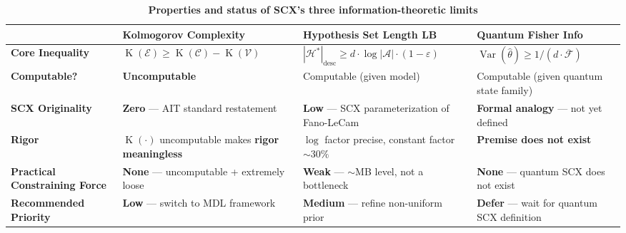 \documentclass[12pt,a4paper]{article}
\theoremstyle{plain}
\theoremstyle{definition}
\DeclareMathOperator{\Kolm}{K}
\DeclareMathOperator{\Var}{Var}
\newcommand{\FisherQuantum}{\mathcal{F}}
\begin{document}
\begin{table}[h!]
\centering
\caption{\textbf{Properties and status of SCX's three information-theoretic limits}}
\label{tab:three_limits}
\renewcommand{\arraystretch}{1.6}
\begin{tabular}{@{}p{2.8cm} p{3.5cm} p{3.5cm} p{3.5cm}@{}}
\toprule
& \textbf{Kolmogorov Complexity} & \textbf{Hypothesis Set Length LB} & \textbf{Quantum Fisher Info} \\
\midrule
\textbf{Core Inequality} &
$\Kolm(\mathcal{E}) \geq \Kolm(\mathcal{C}) - \Kolm(\mathcal{V})$ &
$|\mathcal{H}^*|_{\text{desc}} \geq d \cdot \log|\mathcal{A}| \cdot (1-\varepsilon)$ &
$\Var(\hat{\theta}) \geq 1/(d \cdot \overline{\FisherQuantum})$ \\
\midrule
\textbf{Computable?} &
\textbf{Uncomputable} &
Computable (given model) &
Computable (given quantum state family) \\
\midrule
\textbf{SCX Originality} &
\textbf{Zero} --- AIT standard restatement &
\textbf{Low} --- SCX parameterization of Fano-LeCam &
\textbf{Formal analogy} --- not yet defined \\
\midrule
\textbf{Rigor} &
$\Kolm(\cdot)$ uncomputable makes
\textbf{rigor meaningless} &
$\log$ factor precise,
constant factor $\sim 30\%$ &
\textbf{Premise does not exist} \\
\midrule
\textbf{Practical Constraining Force} &
\textbf{None} ---
uncomputable + extremely loose &
\textbf{Weak} ---
$\sim$MB level, not a bottleneck &
\textbf{None} ---
quantum SCX does not exist \\
\midrule
\textbf{Recommended Priority} &
\textbf{Low} ---
switch to MDL framework &
\textbf{Medium} ---
refine non-uniform prior &
\textbf{Defer} ---
wait for quantum SCX definition \\
\bottomrule
\end{tabular}
\end{table}
\end{document}
